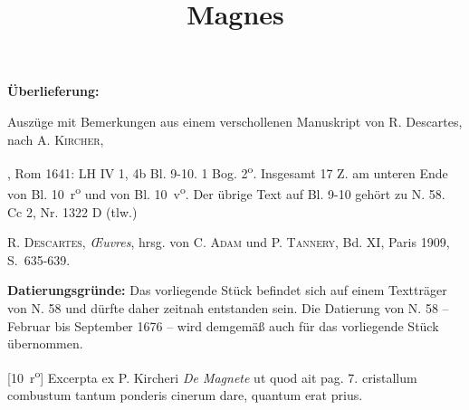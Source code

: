 \begin{ledgroupsized}[r]{120mm}
\footnotesize 
\pstart                
\noindent\textbf{\"{U}berlieferung:}   
\pend
\end{ledgroupsized}
\begin{ledgroupsized}[r]{114mm}
\footnotesize 
\pstart \parindent -6mm
%
Auszüge mit Bemerkungen aus einem verschollenen Manuskript von R. Descartes, nach \cite{01060}A. \textsc{Kircher}, \title{Magnes}, Rom 1641:
LH IV 1, 4b Bl. 9-10. 1 Bog. 2\textsuperscript{o}.
Insgesamt 17 Z. am unteren Ende von Bl. 10~r\textsuperscript{o} und von Bl. 10~v\textsuperscript{o}. Der übrige Text auf Bl. 9-10 gehört zu N. 58.%
\newline%
Cc 2, Nr. 1322 D (tlw.)
\pend
\end{ledgroupsized}
%
\begin{ledgroupsized}[r]{114mm}
\footnotesize 
\pstart \parindent -6mm
%
\cite{00120}R. \textsc{Descartes}, \textit{{\OE}uvres}, hrsg. von \textsc{C. Adam} und \textsc{P. Tannery}, Bd. XI, Paris 1909, S.~635-639.
\pend
\end{ledgroupsized}
%
\vspace*{5mm}%
\begin{ledgroup}
\footnotesize%
\pstart%
\noindent%
\footnotesize{\textbf{Datierungsgr\"{u}nde:}
Das vorliegende Stück befindet sich auf einem Textträger von N. 58 
und dürfte daher zeitnah entstanden sein.
Die Datierung von N. 58 %
-- Februar bis September 1676 -- wird demgemäß auch für das vorliegende Stück übernommen.}
\pend
\end{ledgroup}
%
\count{}
\count{}
\count{}
\vspace*{8mm}
\pstart%
\normalsize%
\noindent%
[10~r\textsuperscript{o}] Excerpta ex P. Kircheri\protect{} \textit{De Magnete}\cite{01060} ut quod \protect{} ait pag. 7. cristallum\protect{} combustum tantum ponderis\protect{} cinerum\protect{} dare, quantum erat prius.
